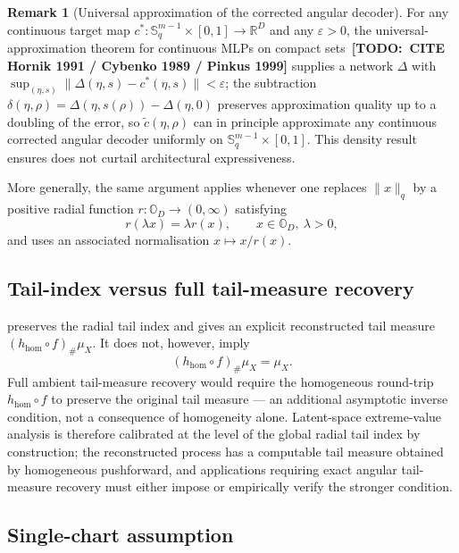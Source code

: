 \documentclass{article}
\theoremstyle{definition}
\newtheorem{remark}[theorem]{Remark}
\newcommand{\todo}[1]{{\color{red}\textbf{[TODO:~#1]}}}
\begin{document}
\begin{remark}[Universal approximation of the corrected angular decoder]
\label{rmk:universal-approx-delta}
For any continuous target map \(c^{*}:\mathbb{S}^{m-1}_q\times[0,1]\to\mathbb{R}^D\) and any \(\varepsilon>0\), the universal-approximation theorem for continuous MLPs on compact sets~\todo{CITE Hornik 1991 / Cybenko 1989 / Pinkus 1999} supplies a network \(\Delta\) with \(\sup_{(\eta,s)}\|\Delta(\eta,s)-c^{*}(\eta,s)\|<\varepsilon\); the subtraction \(\delta(\eta,\rho)=\Delta(\eta,s(\rho))-\Delta(\eta,0)\) preserves approximation quality up to a doubling of the error, so \(\tilde c(\eta,\rho)\) can in principle approximate any continuous corrected angular decoder uniformly on \(\mathbb{S}^{m-1}_q\times[0,1]\). This density result ensures  does not curtail architectural expressiveness.
\end{remark}

More generally, the same argument applies whenever one replaces
\(\|x\|_{q}\) by a positive radial function \(r : \mathbb{O}_D \to (0,\infty)\)
satisfying
\[
r(\lambda x) = \lambda r(x),
\qquad x \in \mathbb{O}_D,\ \lambda > 0,
\]
and uses an associated normalisation \(x \mapsto x/r(x)\).

\subsection{Tail-index versus full tail-measure recovery}
\label{sec:appendix:index-vs-measure}

 preserves the radial tail index and gives an explicit reconstructed tail measure \((h_{\mathrm{hom}}\circ f)_{\#}\mu_X\). It does not, however, imply
\[
(h_{\mathrm{hom}}\circ f)_{\#}\mu_X=\mu_X.
\]
Full ambient tail-measure recovery would require the homogeneous round-trip \(h_{\mathrm{hom}}\circ f\) to preserve the original tail measure --- an additional asymptotic inverse condition, not a consequence of homogeneity alone. Latent-space extreme-value analysis is therefore calibrated at the level of the global radial tail index by construction; the reconstructed process has a computable tail measure obtained by homogeneous pushforward, and applications requiring exact angular tail-measure recovery must either impose or empirically verify the stronger condition.

\subsection{Single-chart assumption}
\end{document}
